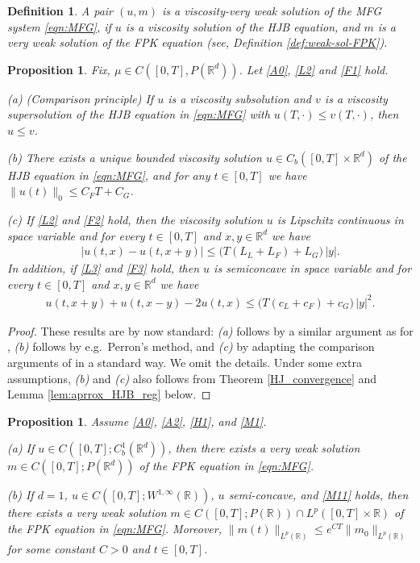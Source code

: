 \documentclass[a4paper,  twoside, 10pt, leqno]{amsart}
\newcommand{\TR}{[0,T]\times\mathbb{R}^d}
\newcommand{\R}{\mathbb{R}}
\newcommand{\rd}{\mathbb{R}^d}
\newtheorem{proposition}[thm]{Proposition}
\newtheorem{definition}[thm]{Definition}
\theoremstyle{remark}
\theoremstyle{definition}
\begin{document}
\begin{definition}
A pair $(u,m)$ is a viscosity-very weak solution of the MFG system \eqref{eqn:MFG}, 
if $u$ is a viscosity solution of the HJB equation, and 
$m$ is a very weak solution of the FPK equation (see, Definition \ref{def:weak-sol-FPK}).
\end{definition}


\begin{proposition} \label{prop:viscosity_sol_HJB}
Fix, $\mu \in C([0,T],P(\rd))$. Let \ref{A0}, \ref{L2} and \ref{F1} hold.  

\smallskip\noindent
(a) (Comparison principle) If $u$ is a viscosity subsolution and $v$ is a viscosity supersolution of the HJB equation in \eqref{eqn:MFG} with $u(T,\cdot)\leq v(T,\cdot)$,  then  $u\leq v$. 

\medskip\noindent (b) There exists a unique bounded viscosity solution $u \in C_b(\TR)$ of the HJB equation in \eqref{eqn:MFG}, and 
for any $t\in [0,T]$ we have $\|u(t)\|_{0} \leq C_FT + C_G$. 

\medskip\noindent(c) If \ref{L2} and \ref{F2} hold, then the viscosity solution $u$ is Lipschitz continuous in space variable and for every $t\in [0,T]$ and $x,y \in \rd$ we have \begin{align*}
|u(t,x) - u(t,x+y)| \leq \big(T(L_L+L_F) + L_G\big) \, |y|. 
\end{align*}  
 In addition, if \ref{L3} and \ref{F3} hold, then $u$ is semiconcave in space variable and for every $t\in [0,T]$ and $x,y \in \rd$ we have \begin{align*}
u(t,x+y) + u(t,x-y) - 2u(t,x) \leq \big(T(c_L+c_F) + c_G\big) \, |y|^2. 
\end{align*}  
\end{proposition}
\begin{proof}
These results are by now standard: \textit{(a)} follows by a similar argument as for \cite[Theorem 3.1]{MR2129093}, \textit{(b)} follows by e.g.~Perron's method, and \textit{(c)} by adapting the comparison arguments of \cite{MR2129093} in a standard way. We omit the details.
Under some extra assumptions, \textit{(b)} and \textit{(c)} also follows from Theorem \ref{HJ_convergence} and Lemma \ref{lem:aprrox_HJB_reg} below.
\end{proof}
\begin{proposition}\label{prop:weak_sol_FPK-general-d}
Assume \ref{A0}, \ref{A2}, \ref{H1}, and \ref{M1}. 

\smallskip\noindent(a) If $u \in C([0,T] ; C^1_b(\rd))$, then there exists a very weak solution $m \in C([0,T];P(\rd))$ of the
     FPK equation in \eqref{eqn:MFG}. 
     
     \medskip\noindent(b) If $d=1$,  
     $u \in C([0,T] ; W^{1,\infty}(\R))$, $u$ semi-concave,
     and  \ref{M11} holds,
     then there exists a very weak solution $m \in C([0,T];P(\R)) \cap L^{p}([0,T]\times \R)$ 
     of the FPK equation in \eqref{eqn:MFG}.
     Moreover,  $\|m(t)\|_{L^p(\R)} \leq e^{CT}\|m_0\|_{L^p(\R)}$ for some constant $C>0$ and $t\in[0,T]$.
\end{proposition}
\end{document}
